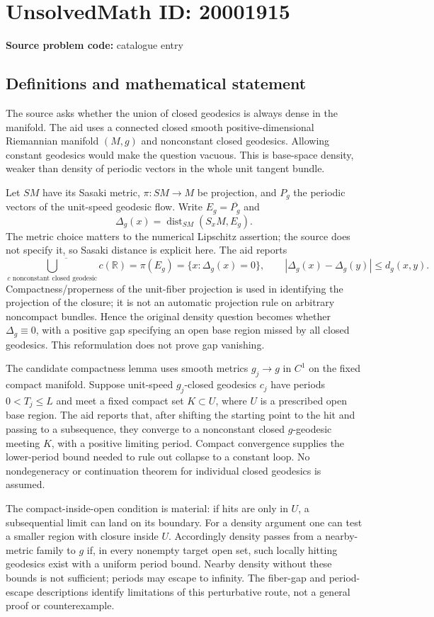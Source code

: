 \documentclass[11pt]{article}
\newcommand{\R}{\mathbb{R}}
\begin{document}
\section*{UnsolvedMath ID: 20001915}
\textbf{Source problem code:} catalogue entry
\subsection{Definitions and mathematical statement}
The source asks whether the union of closed geodesics is always dense in the manifold. The aid uses a connected closed smooth positive-dimensional Riemannian manifold \((M,g)\) and nonconstant closed geodesics. Allowing constant geodesics would make the question vacuous. This is base-space density, weaker than density of periodic vectors in the whole unit tangent bundle.

Let \(SM\) have its Sasaki metric, \(\pi:SM\to M\) be projection, and \(P_g\) the periodic vectors of the unit-speed geodesic flow. Write \(E_g=\overline{P_g}\) and
\[
 \Delta_g(x)=\operatorname{dist}_{SM}(S_xM,E_g).
\]
The metric choice matters to the numerical Lipschitz assertion; the source does not specify it, so Sasaki distance is explicit here. The aid reports
\[
 \overline{\bigcup_{c\text{ nonconstant closed geodesic}}c(\R)}
       =\pi(E_g)=\{x:\Delta_g(x)=0\},
 \qquad |\Delta_g(x)-\Delta_g(y)|\le d_g(x,y).
\]
Compactness/properness of the unit-fiber projection is used in identifying the projection of the closure; it is not an automatic projection rule on arbitrary noncompact bundles. Hence the original density question becomes whether \(\Delta_g\equiv0\), with a positive gap specifying an open base region missed by all closed geodesics. This reformulation does not prove gap vanishing.

The candidate compactness lemma uses smooth metrics \(g_j\to g\) in \(C^1\) on the fixed compact manifold. Suppose unit-speed \(g_j\)-closed geodesics \(c_j\) have periods \(0<T_j\le L\) and meet a fixed compact set \(K\subset U\), where \(U\) is a prescribed open base region. The aid reports that, after shifting the starting point to the hit and passing to a subsequence, they converge to a nonconstant closed \(g\)-geodesic meeting \(K\), with a positive limiting period. Compact convergence supplies the lower-period bound needed to rule out collapse to a constant loop. No nondegeneracy or continuation theorem for individual closed geodesics is assumed.

The compact-inside-open condition is material: if hits are only in \(U\), a subsequential limit can land on its boundary. For a density argument one can test a smaller region with closure inside \(U\). Accordingly density passes from a nearby-metric family to \(g\) if, in every nonempty target open set, such locally hitting geodesics exist with a uniform period bound. Nearby density without these bounds is not sufficient; periods may escape to infinity. The fiber-gap and period-escape descriptions identify limitations of this perturbative route, not a general proof or counterexample.
\end{document}
